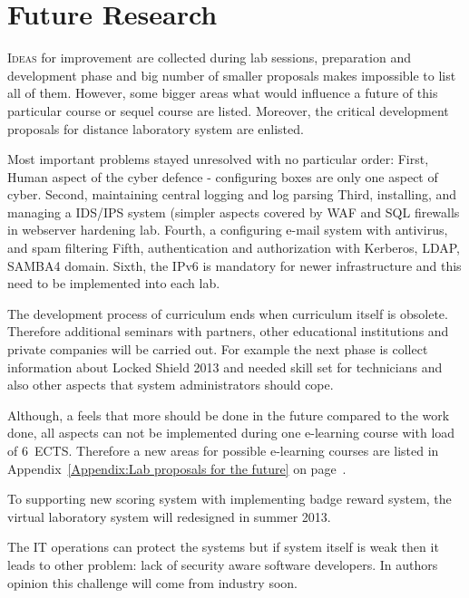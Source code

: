 \chapter{Future Research}
\label{Future Research}

\lettrine[lraise=0.1, nindent=0em, slope=-.5em]{\color{Violet}I}{deas} for improvement are collected during lab sessions, preparation and development phase and big number of smaller proposals makes impossible to list all of them. However, some bigger areas what would influence a future of this particular course or sequel course are listed. Moreover, the critical development proposals for distance laboratory system are enlisted.

Most important problems stayed unresolved with no particular order:
First, Human aspect of the cyber defence - configuring boxes are only one aspect of cyber. 
Second, maintaining central logging and log parsing
Third, installing, and managing a \gls{IDS}/\gls{IPS} system (simpler aspects covered by  \gls{WAF} and \gls{SQL} firewalls in webserver hardening lab.
Fourth, a configuring e-mail system with antivirus, and spam filtering
Fifth, authentication and authorization with Kerberos, LDAP, SAMBA4 domain.
Sixth, the IPv6 is mandatory for newer infrastructure and this need to be implemented into each lab.


The development process of curriculum ends when curriculum itself is obsolete. Therefore additional seminars with partners, other educational institutions and private companies will be carried out. For example the next phase is collect information about Locked Shield 2013 and needed skill set for technicians and also other aspects that system administrators should cope.

Although, a feels that more should be done in the future compared to the work done, all aspects can not be implemented during one e-learning course with load of 6~\gls{ECTS}. Therefore a new areas for possible e-learning courses are listed in Appendix~\ref{Appendix:Lab proposals for the future} on page~\pageref{Appendix:Lab proposals for the future}.

To supporting new scoring system with implementing badge reward system, the virtual laboratory system will redesigned in summer 2013.

The IT operations can protect the systems but if system itself is weak then it leads to other problem: lack of security aware software developers. In authors opinion this challenge will come from industry soon.